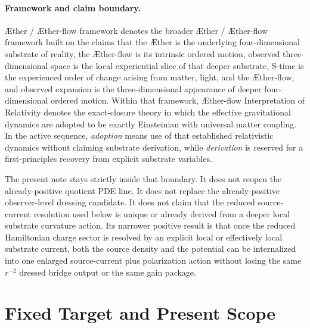 \documentclass[11pt]{article}
\newcommand{\Aether}{\AE{}ther}
\newcommand{\Aflow}{\AE{}ther-flow}
\newcommand{\TheoryName}{\Aflow{} Interpretation of Relativity}
\newcommand{\TheoryProgram}{\Aether{} / \Aflow{} framework}
\begin{document}
\paragraph{Framework and claim boundary.}
\TheoryProgram{} denotes the broader \Aether{} / \Aflow{} framework built on the claims that the \Aether{} is the underlying four-dimensional substrate of reality, the \Aflow{} is its intrinsic ordered motion, observed three-dimensional space is the local experiential slice of that deeper substrate, S-time is the experienced order of change arising from matter, light, and the \Aflow{}, and observed expansion is the three-dimensional appearance of deeper four-dimensional ordered motion. Within that framework, \TheoryName{} denotes the exact-closure theory in which the effective gravitational dynamics are adopted to be exactly Einsteinian with universal matter coupling. In the active sequence, \emph{adoption} means use of that established relativistic dynamics without claiming substrate derivation, while \emph{derivation} is reserved for a first-principles recovery from explicit substrate variables.

The present note stays strictly inside that boundary. It does not reopen the already-positive quotient PDE line. It does not replace the already-positive observer-level dressing candidate. It does not claim that the reduced source-current resolution used below is unique or already derived from a deeper local substrate curvature action. Its narrower positive result is that once the reduced Hamiltonian charge sector is resolved by an explicit local or effectively local substrate current, both the source density and the potential can be internalized into one enlarged source-current plus polarization action without losing the same \(r^{-2}\) dressed bridge output or the same gain package.

\section{Fixed Target and Present Scope}
\end{document}
